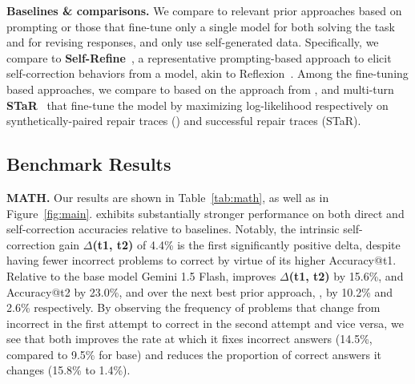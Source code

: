 \textbf{Baselines \& comparisons.} We compare \methodname{} to relevant prior approaches based on prompting or those that fine-tune only a single model for both solving the task and for revising responses, and only use self-generated data. Specifically, we compare to \textbf{Self-Refine}~\citep{madaan2023self}, a representative prompting-based approach to elicit self-correction behaviors from a model, akin to Reflexion~\citep{shinn2023reflexion}.
Among the fine-tuning based approaches, we compare to \textbf{\pairsft{}} based on the approach from \citet{welleck2023generating}, and multi-turn \textbf{STaR}~\citep{zelikman2022star, singh2023beyond} that fine-tune the model by maximizing log-likelihood respectively on synthetically-paired repair traces (\pairsft{}) and successful repair traces (STaR).


\vspace{-0.2cm}
\subsection{Benchmark Results}
\vspace{-0.2cm}

\textbf{MATH.} Our results are shown in Table~\ref{tab:math}, as well as in Figure~\ref{fig:main}. \methodname{} %
exhibits substantially stronger performance on both direct and self-correction accuracies relative to baselines. Notably, the intrinsic self-correction gain $\Delta$\textbf{(t1, t2)} of 4.4\% is the first significantly positive delta, despite having fewer incorrect problems to correct by virtue of its higher Accuracy@t1. Relative to the base model Gemini 1.5 Flash, \methodname{} improves $\Delta$\textbf{(t1, t2)} by 15.6\%, and Accuracy@t2 by 23.0\%, and over the next best prior approach, \pairsft{}, by 10.2\% and 2.6\% respectively. By observing the frequency of problems that change from incorrect in the first attempt to correct in the second attempt and vice versa, we see that \methodname{} both improves the rate at which it fixes incorrect answers (14.5\%, compared to 9.5\% for base) and reduces the proportion of correct answers it changes (15.8\% to 1.4\%). 


